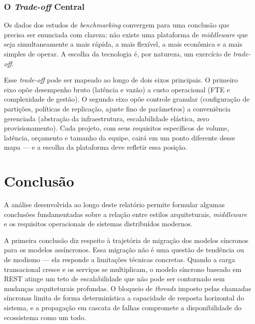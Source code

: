 \documentclass[12pt, a4paper]{article}
\begin{document}
\subsubsection{O \textit{Trade-off} Central}

Os dados dos estudos de \textit{benchmarking} \cite{gopisetty2026, benchmarking2025} convergem para uma conclusão que precisa ser enunciada com clareza: não existe uma plataforma de \textit{middleware} que seja simultaneamente a mais rápida, a mais flexível, a mais econômica e a mais simples de operar. A escolha da tecnologia é, por natureza, um exercício de \textit{trade-off}.

Esse \textit{trade-off} pode ser mapeado ao longo de dois eixos principais. O primeiro eixo opõe desempenho bruto (latência e vazão) a custo operacional (FTE e complexidade de gestão). O segundo eixo opõe controle granular (configuração de partições, políticas de replicação, ajuste fino de parâmetros) a conveniência gerenciada (abstração da infraestrutura, escalabilidade elástica, zero provisionamento). Cada projeto, com seus requisitos específicos de volume, latência, orçamento e tamanho da equipe, cairá em um ponto diferente desse mapa --- e a escolha da plataforma deve refletir essa posição.


\section{Conclusão}

A análise desenvolvida ao longo deste relatório permite formular algumas conclusões fundamentadas sobre a relação entre estilos arquiteturais, \textit{middleware} e os requisitos operacionais de sistemas distribuídos modernos.

A primeira conclusão diz respeito à trajetória de migração dos modelos síncronos para os modelos assíncronos. Essa migração não é uma questão de tendência ou de modismo --- ela responde a limitações técnicas concretas. Quando a carga transacional cresce e os serviços se multiplicam, o modelo síncrono baseado em REST atinge um teto de escalabilidade que não pode ser contornado sem mudanças arquiteturais profundas. O bloqueio de \textit{threads} imposto pelas chamadas síncronas limita de forma determinística a capacidade de resposta horizontal do sistema, e a propagação em cascata de falhas compromete a disponibilidade do ecossistema como um todo.
\end{document}
